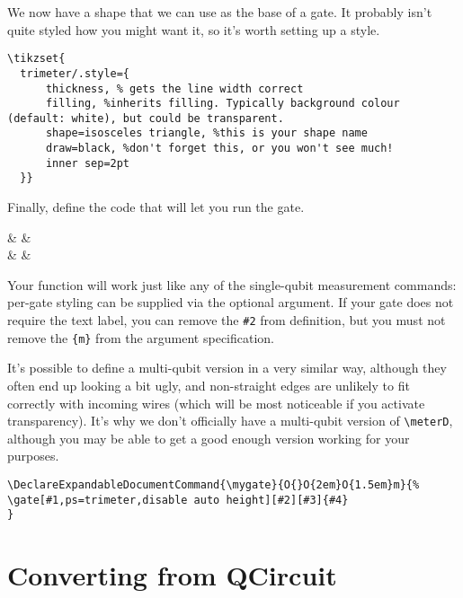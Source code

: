 \documentclass[aps,pra,10pt,nofootinbib]{revtex4-2}
\begin{document}
We now have a shape that we can use as the base of a gate. It probably isn't quite styled how you might want it, so it's worth setting up a style.

\begin{FullCode}
\begin{lstlisting}
\tikzset{
  trimeter/.style={
      thickness, % gets the line width correct
      filling, %inherits filling. Typically background colour (default: white), but could be transparent.
      shape=isosceles triangle, %this is your shape name
      draw=black, %don't forget this, or you won't see much!
      inner sep=2pt
  }}
\end{lstlisting}
\end{FullCode}

Finally, define the code that will let you run the gate.
\begin{Code}

\begin{quantikz}[classical gap=0.05cm]
 &  &  \\
& &
\end{quantikz}
\end{Code}
Your function will work just like any of the single-qubit measurement commands: per-gate styling can be supplied via the optional argument. If your gate does not require the text label, you can remove the \texttt{\#2} from definition, but you must not remove the \texttt{\{m\}} from the argument specification.

It's possible to define a multi-qubit version in a very similar way, although they often end up looking a bit ugly, and non-straight edges are unlikely to fit correctly with incoming wires (which will be most noticeable if you activate transparency). It's why we don't officially have a multi-qubit version of \verb!\meterD!, although you may be able to get a good enough version working for your purposes.

\begin{FullCode}
\begin{lstlisting}
\DeclareExpandableDocumentCommand{\mygate}{O{}O{2em}O{1.5em}m}{%
\gate[#1,ps=trimeter,disable auto height][#2][#3]{#4}
}
\end{lstlisting}
\end{FullCode}


\section{Converting from QCircuit}
\end{document}
